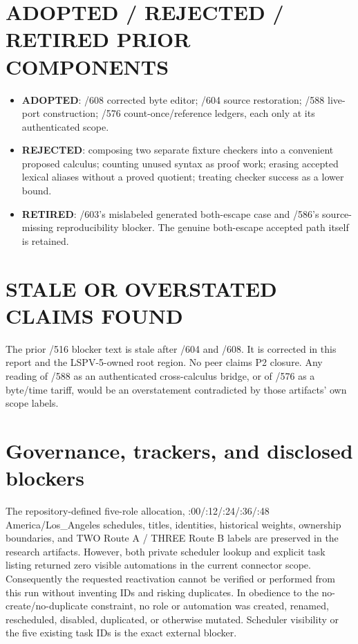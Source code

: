 \documentclass[11pt]{article}
\newcommand{\status}[1]{\textbf{#1}}
\begin{document}
\section{ADOPTED / REJECTED / RETIRED PRIOR COMPONENTS}
\begin{itemize}
\item \status{ADOPTED}: /608 corrected byte editor; /604 source restoration;
/588 live-port construction; /576 count-once/reference ledgers, each only at
its authenticated scope.
\item \status{REJECTED}: composing two separate fixture checkers into a
convenient proposed calculus; counting unused syntax as proof work; erasing
accepted lexical aliases without a proved quotient; treating checker success
as a lower bound.
\item \status{RETIRED}: /603's mislabeled generated both-escape case and /586's
source-missing reproducibility blocker.  The genuine both-escape accepted path
itself is retained.
\end{itemize}

\section{STALE OR OVERSTATED CLAIMS FOUND}
The prior /516 blocker text is stale after /604 and /608.  It is corrected in
this report and the LSPV-5-owned root region.  No peer claims P2 closure.  Any
reading of /588 as an authenticated cross-calculus bridge, or of /576 as a
byte/time tariff, would be an overstatement contradicted by those artifacts'
own scope labels.

\section{Governance, trackers, and disclosed blockers}
The repository-defined five-role allocation, :00/:12/:24/:36/:48
America/Los\_Angeles schedules, titles, identities, historical weights,
ownership boundaries, and TWO Route A / THREE Route B labels are preserved in
the research artifacts.  However, both private scheduler lookup and explicit
task listing returned zero visible automations in the current connector scope.
Consequently the requested reactivation cannot be verified or performed from
this run without inventing IDs and risking duplicates.  In obedience to the
no-create/no-duplicate constraint, no role or automation was created, renamed,
rescheduled, disabled, duplicated, or otherwise mutated.  Scheduler visibility
or the five existing task IDs is the exact external blocker.
\end{document}
